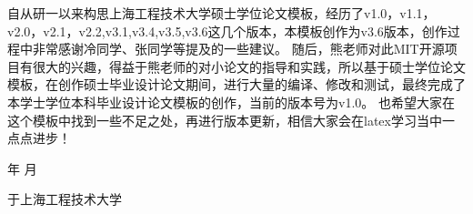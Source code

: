 \newpage
{}
\begin{center}
    \heiti\bfseries\xiaoer{}
\end{center}

自从研一以来构思上海工程技术大学硕士学位论文模板，经历了v1.0，v1.1，v2.0，v2.1，v2.2,v3.1,v3.4,v3.5,v3.6这几个版本，本模板创作为v3.6版本，创作过程中非常感谢冷同学、张同学等提及的一些建议。
随后，熊老师对此MIT开源项目有很大的兴趣，得益于熊老师的对小论文的指导和实践，所以基于硕士学位论文模板，在创作硕士毕业设计论文期间，进行大量的编译、修改和测试，最终完成了本学士学位本科毕业设计论文模板的创作，当前的版本号为v1.0。
也希望大家在这个模板中找到一些不足之处，再进行版本更新，相信大家会在latex学习当中一点点进步！

\vspace{0.56\textheight}

\begin{flushright}
    \number\year    年 \number\month  月
    
    于上海工程技术大学
\end{flushright}